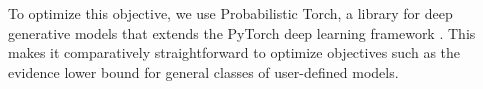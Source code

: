 \documentclass{article}
\newcommand{\scf}{\textsc{f}}
\newcommand{\scw}{\textsc{w}}
\newcommand{\scp}{\textsc{p}}
\newcommand{\scs}{\textsc{s}}
\begin{document}
To optimize this objective, we use Probabilistic Torch, a library for deep generative models that extends the PyTorch deep learning framework  \cite{narayanaswamy2017learning,2018probtorch}. This makes it comparatively straightforward to optimize objectives such as the evidence lower bound for general classes of user-defined models. 
\end{document}
